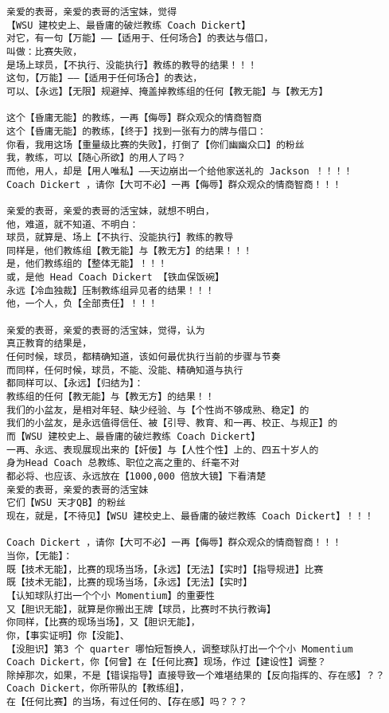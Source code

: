 \documentclass[9pt, b5paper]{article}
\begin{document}
\begin{verbatim}
亲爱的表哥，亲爱的表哥的活宝妹，觉得
【WSU 建校史上、最昏庸的破烂教练 Coach Dickert】
对它，有一句【万能】——【适用于、任何场合】的表达与借口，
叫做：比赛失败，
是场上球员，【不执行、没能执行】教练的教导的结果！！！
这句，【万能】——【适用于任何场合】的表达，
可以、【永远】【无限】规避掉、掩盖掉教练组的任何【教无能】与【教无方】

这个【昏庸无能】的教练，一再【侮辱】群众观众的情商智商
这个【昏庸无能】的教练，【终于】找到一张有力的牌与借口：
你看，我用这场【重量级比赛的失败】，打倒了【你们幽幽众口】的粉丝
我，教练，可以【随心所欲】的用人了吗？
而他，用人，却是【用人唯私】——天边崩出一个给他家送礼的 Jackson ！！！！
Coach Dickert ，请你【大可不必】一再【侮辱】群众观众的情商智商！！！

亲爱的表哥，亲爱的表哥的活宝妹，就想不明白，
他，难道，就不知道、不明白：
球员，就算是、场上【不执行、没能执行】教练的教导
同样是，他们教练组【教无能】与【教无方】的结果！！！
是，他们教练组的【整体无能】！！！
或，是他 Head Coach Dickert 【铁血保饭碗】
永远【冷血独裁】压制教练组异见者的结果！！！
他，一个人，负【全部责任】！！！

亲爱的表哥，亲爱的表哥的活宝妹，觉得，认为
真正教育的结果是，
任何时候，球员，都精确知道，该如何最优执行当前的步骤与节奏
而同样，任何时候，球员，不能、没能、精确知道与执行
都同样可以、【永远】【归结为】：
教练组的任何【教无能】与【教无方】的结果！！
我们的小盆友，是相对年轻、缺少经验、与【个性尚不够成熟、稳定】的
我们的小盆友，是永远值得信任、被【引导、教育、和一再、校正、与规正】的
而【WSU 建校史上、最昏庸的破烂教练 Coach Dickert】
一再、永远、表现展现出来的【奸佞】与【人性个性】上的、四五十岁人的
身为Head Coach 总教练、职位之高之重的、纤毫不对
都必将、也应该、永远放在【1000,000 倍放大镜】下看清楚
亲爱的表哥，亲爱的表哥的活宝妹
它们【WSU 天才QB】的粉丝
现在，就是，【不待见】【WSU 建校史上、最昏庸的破烂教练 Coach Dickert】！！！

Coach Dickert ，请你【大可不必】一再【侮辱】群众观众的情商智商！！！
当你，【无能】：
既【技术无能】，比赛的现场当场，【永远】【无法】【实时】【指导规进】比赛
既【技术无能】，比赛的现场当场，【永远】【无法】【实时】
【认知球队打出一个个小 Momentium】的重要性
又【胆识无能】，就算是你搬出王牌【球员，比赛时不执行教诲】
你同样，【比赛的现场当场】，又【胆识无能】，
你，【事实证明】你【没能】、
【没胆识】第3 个 quarter 哪怕短暂换人，调整球队打出一个个小 Momentium
Coach Dickert，你【何曾】在【任何比赛】现场，作过【建设性】调整？
除掉那次，如果，不是【错误指导】直接导致一个难堪结果的【反向指挥的、存在感】？？
Coach Dickert，你所带队的【教练组】，
在【任何比赛】的当场，有过任何的、【存在感】吗？？？


\end{verbatim}
\end{document}
